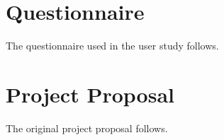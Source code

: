\documentclass[12pt,twoside,notitlepage,xetex]{report}
\begin{document}




\cleardoublepage



\cleardoublepage

\appendix

\chapter{Questionnaire}

The questionnaire used in the user study follows.



\cleardoublepage

\chapter{Project Proposal}

The original project proposal follows.


% 
\end{document}

